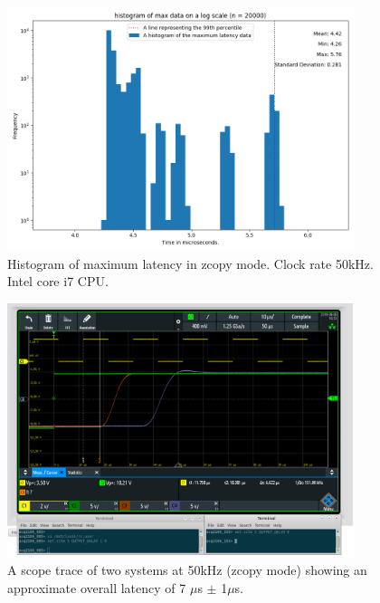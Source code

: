 \documentclass{article}
\begin{document}
\begin{figure} [htb!]
	\centering
	\includegraphics[width=4.0in]{images/better_images/50kHz_final_small.png}
	\caption{Histogram of maximum latency in zcopy mode. Clock rate 50kHz. Intel core i7 CPU.}
	\label{zcopy50hist}
\end{figure}

\begin{figure} [htb!]
	\centering
	\includegraphics[width=4.0in]{images/50kHz_annotated_scope_2.png}
	\caption{A scope trace of two systems at 50kHz (zcopy mode) showing an approximate overall latency of 7 $\mu$s $\pm$ 1$\mu$s.}
	\label{zcopy50scope}
\end{figure}
\end{document}
